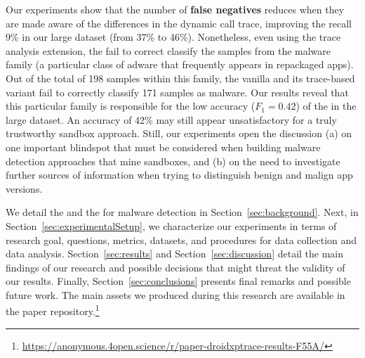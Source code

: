 Our experiments show that the number of {\bf false negatives} reduces when they are made aware of the
differences in the dynamic call trace, improving the recall 9\% in our large dataset (from 37\% to 46\%). 
Nonetheless, even using the trace analysis extension, the \mas fail to correct classify the samples
from the \gps malware family (a particular class of adware that frequently appears in repackaged apps).
Out of the total of 198 samples within this family, the vanilla \mas and its trace-based variant
fail to correctly classify 171 samples as malware. Our results reveal that this particular family is
responsible for the low accuracy ($F_1 = 0.42$) of the \mas in the large dataset. 
An accuracy of 42\% may still appear unsatisfactory for a truly trustworthy sandbox approach. Still, 
our experiments open the discussion (a) on one important blindspot that must be considered when building 
malware detection approaches that mine sandboxes, and (b) on the need to investigate further sources of
information when trying to distinguish benign and malign app versions.

We detail the \mas and the \mas for malware detection in
Section~\ref{sec:background}. Next, in Section~\ref{sec:experimentalSetup}, we
characterize our experiments in terms of research goal, questions, metrics, datasets, 
and procedures for data collection and data analysis. Section~\ref{sec:results} and
Section~\ref{sec:discussion} detail the main findings of our research and
possible decisions that might threat the validity of our results. Finally,
Section~\ref{sec:conclusions} presents final remarks and possible future
work. The main assets we produced during this research are available in the
paper repository.\footnote{\url{https://anonymous.4open.science/r/paper-droidxptrace-results-F55A/}}
